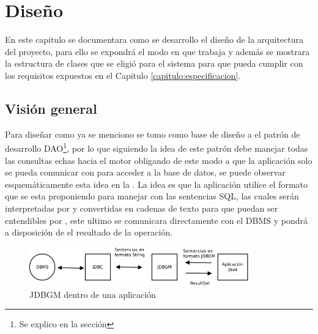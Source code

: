 \chapter{Diseño}\label{cap:disenio}

En este capitulo se documentara como se desarrollo el diseño de la arquitectura del proyecto, para ello se expondrá el modo en que trabaja \jd y además se mostrara la estructura de clases que se eligió para el sistema para que pueda cumplir con los requisitos expuestos en el Capitulo \ref{capitulo:especificacion}.
%
%
%
\section{Visión general}
Para diseñar \jj como ya se menciono se tomo como base de diseño a el patrón de desarrollo DAO\footnote{Se explico en la sección }, por lo que siguiendo la idea de este patrón \jj debe manejar todas las consultas echas hacia el motor obligando de este modo a que la aplicación solo se pueda comunicar con \jj para acceder a la base de datos, se puede observar esquemáticamente esta idea en la . La idea es que la aplicación utilice el formato que se esta proponiendo para manejar con las sentencias SQL, las cuales serán interpretadas por \jj y convertidas en cadenas de texto para que puedan ser entendibles por \jd, este ultimo se comunicara directamente con el DBMS y pondrá a disposición de \jj el resultado de la operación. 
%
\begin{figure}[h]
  \centering
    \includegraphics[width=0.85\textwidth]{figuras/jdbgm-overview.png}
  \caption{JDBGM dentro de una aplicación}
  \label{fig:jdbgm:overview}
\end{figure}

